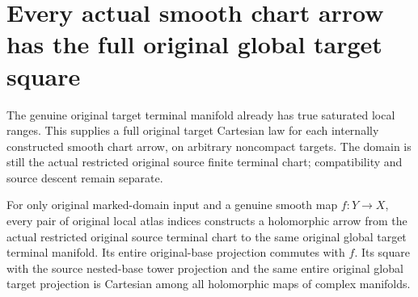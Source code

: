 \section{Every actual smooth chart arrow has the full original global target square}

The genuine original target terminal manifold already has true saturated
local ranges. This supplies a full original target Cartesian law for each
internally constructed smooth chart arrow, on arbitrary noncompact targets.
The domain is still the actual restricted original source finite terminal
chart; compatibility and source descent remain separate.

\begin{theorem}
\label{hir:original-local-smooth-arrow-actual-global-target-cartesian}
\leanok
{}
For only original marked-domain input and a genuine smooth map $f:Y\to X$,
every pair of original local atlas indices constructs a holomorphic arrow
from the actual restricted original source terminal chart to the same
original global target terminal manifold. Its entire original-base projection
commutes with $f$. Its square with the source nested-base tower projection
and the same entire original global target projection is Cartesian among
all holomorphic maps of complex manifolds.
\end{theorem}
